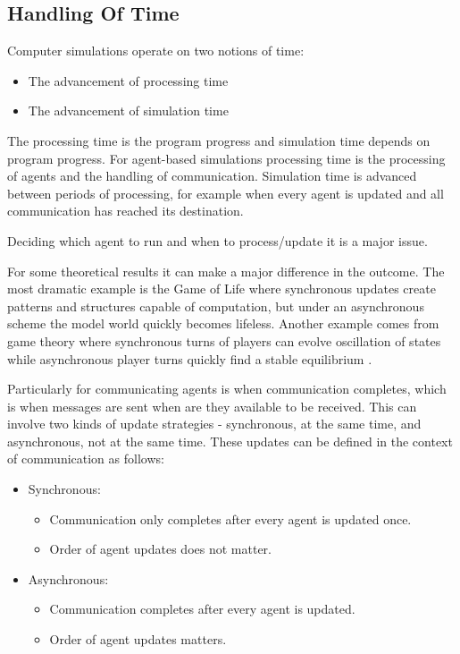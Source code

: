 \documentclass[a4paper,11pt]{article}
\begin{document}
\subsection{Handling Of Time}
\label{handlingoftime}

Computer simulations operate on two notions of time:

\begin{itemize}
\item The advancement of processing time
\item The advancement of simulation time
\end{itemize}

The processing time is the program progress and simulation time depends on program progress.
For agent-based simulations processing time is the processing of agents and the handling of communication.
Simulation time is advanced between periods of processing, for example when every agent is updated and all communication has reached its destination.

Deciding which agent to run and when to process/update it is a major issue.

For some theoretical results it can make a major difference in the outcome. The most dramatic example is the Game of Life where synchronous updates create patterns and structures capable of computation, but under an asynchronous scheme the model world quickly becomes lifeless. Another example comes from game theory where synchronous turns of players can evolve oscillation of states while asynchronous player turns quickly find a stable equilibrium \cite{HUBERMANGLANCE:1993}.

Particularly for communicating agents is when communication completes, which is when messages are sent when are they available to be received.
This can involve two kinds of update strategies - synchronous, at the same time, and asynchronous, not at the same time.
These updates can be defined in the context of communication as follows:

\begin{itemize}
    \item Synchronous:
    \begin{itemize}
    \item Communication only completes after every agent is updated
    once.
        \item Order of agent updates does not matter.
    \end{itemize}
    \item Asynchronous:
    \begin{itemize}
    \item Communication completes after every agent is updated.
        \item Order of agent updates matters.
    \end{itemize}
\end{itemize}
\end{document}
